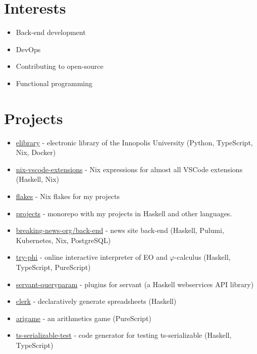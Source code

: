 \documentclass[twocolumn,11pt]{report}
\begin{document}
\section*{Interests}
\begin{itemize}
     \item Back-end development
     \item DevOps
     \item Contributing to open-source
     \item Functional programming
\end{itemize}

\section*{Projects}

\begin{itemize}
     \item \href{https://gitlab.pg.innopolis.university/elibrary/elibrary#electronic-library-of-iu}{elibrary} - electronic library of the Innopolis University (Python, TypeScript, Nix, Docker)
     \item \href{https://github.com/nix-community/nix-vscode-extensions#readme}{nix-vscode-extensions} - Nix expressions for almost all VSCode extensions (Haskell, Nix)
     \item \href{https://github.com/deemp/flakes#readme}{flakes} - Nix flakes for my projects
     \item \href{https://github.com/deemp/projects#readme}{projects} - monorepo with my projects in Haskell and other languages.
     \item \href{https://github.com/breaking-news-org/back-end#readme}{breaking-news-org/back-end} - news site back-end (Haskell, Pulumi, Kubernetes, Nix, PostgreSQL)
     \item \href{https://github.com/objectionary/try-phi#readme}{try-phi} - online interactive interpreter of EO and $\varphi$-calculus (Haskell, TypeScript, PureScript)
     \item \href{https://github.com/deemp/servant-queryparam#readme}{servant-queryparam} - plugins for servant (a Haskell webservices API library)
     \item \href{https://github.com/deemp/clerk#readme}{clerk} - declaratively generate spreadsheets (Haskell)
     \item \href{https://github.com/deemp/arigame#readme}{arigame} - an arithmetics game (PureScript)
     \item \href{https://github.com/deemp/projects/tree/main/haskell/ts-serializable-test#readme}{ts-serializable-test} - code generator for testing ts-serializable (Haskell, TypeScript)
\end{itemize}
\end{document}
